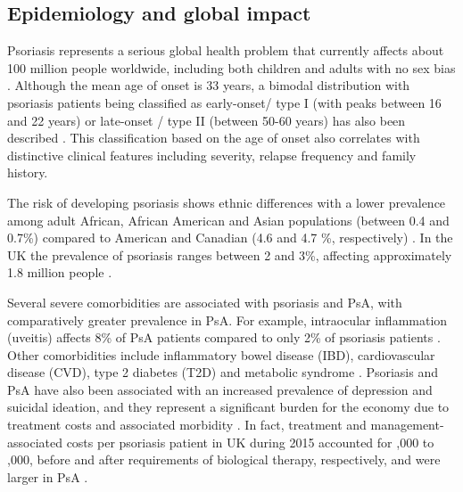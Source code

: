 \subsection{Epidemiology and global impact}
%
Psoriasis represents a serious global health problem that currently affects about 100 million people worldwide, including both children and adults with  no sex bias \parencite{Organization2016}. Although the mean age of onset is 33 years, a bimodal distribution with psoriasis patients being classified as early-onset/ type I (with peaks between 16 and 22 years) or late-onset / type II (between 50-60 years) has also been described \parencite{Henseler1985, Perera2012}. This classification based on the age of onset also correlates with distinctive clinical features including severity, relapse frequency and family history. 

The risk of developing psoriasis shows ethnic differences with a lower prevalence among adult African, African American and Asian populations (between 0.4 and 0.7\%) compared to American and Canadian (4.6 and 4.7 \%, respectively) \parencite{Jacobson2011}. In the UK the prevalence of psoriasis ranges between 2 and 3\%, affecting approximately 1.8 million people \parencite{Perera2012}. 


Several severe comorbidities are associated with psoriasis and PsA, with comparatively greater prevalence in PsA. For example, intraocular inflammation (uveitis) affects 8\% of PsA patients compared to only 2\% of psoriasis patients \parencite{Husted2011, Oliveira2015}. Other comorbidities include inflammatory bowel disease (IBD), cardiovascular disease (CVD), type 2 diabetes (T2D) and metabolic syndrome \parencite{Gelfand2006,Shapiro2007,Cohen2008}. Psoriasis and PsA have also been associated with an increased prevalence of depression and suicidal ideation, and they represent a significant burden for the economy due to treatment costs and associated morbidity \parencite{Sampogna2012}.  In fact, treatment and management-associated costs per psoriasis patient in UK during 2015 accounted for ,000 to ,000, before and after requirements of biological therapy, respectively, and were larger in PsA \parencite{Burgos-Pol2016}.




